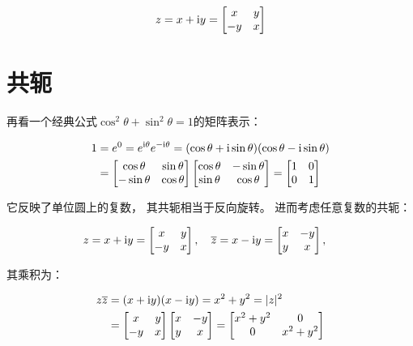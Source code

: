 \documentclass[10pt, openany]{book}
\begin{document}
$$
z = x + \text iy =
\begin{bmatrix}
x & y \\ -y & x
\end{bmatrix}
$$

\section{共轭}

再看一个经典公式$\cos^2\theta + \sin^2\theta = 1$的矩阵表示：

$$
\begin{aligned}
1 &= e^0 = e^{\text i\theta}e^{-\text i\theta} 
= (\cos \theta + \text i\sin \theta)(\cos \theta - \text i\sin \theta) \\
&=\begin{bmatrix}
\cos \theta & \sin \theta \\
-\sin \theta & \cos \theta \\
\end{bmatrix}
\begin{bmatrix}
\cos \theta & -\sin \theta \\
\sin \theta & \cos \theta \\
\end{bmatrix}
=\begin{bmatrix}
1 & 0 \\
0 & 1 \\
\end{bmatrix}
\end{aligned}
$$

它反映了单位圆上的复数，
其共轭相当于反向旋转。
进而考虑任意复数的共轭：

$$
z = x + \text iy =
\begin{bmatrix}
x & y \\ -y & x
\end{bmatrix}, \quad 
\overline z = x - \text iy =
\begin{bmatrix}
x & -y \\ y & x
\end{bmatrix}, \quad 
$$

其乘积为：

$$
\begin{aligned}
z \overline z
&= (x + \text iy)(x - \text iy)
= x^2 + y^2 = |z|^2 \\
&=\begin{bmatrix}
x & y \\ -y & x
\end{bmatrix}
\begin{bmatrix}
x & -y \\ y & x
\end{bmatrix}
=\begin{bmatrix}
x^2 + y^2 & 0 \\ 0 & x^2 + y^2
\end{bmatrix}
\end{aligned}
$$
\end{document}
